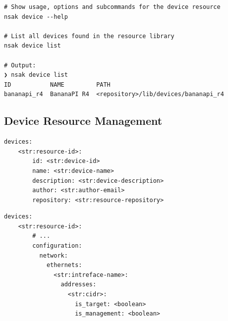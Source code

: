 \begin{listing}[H]
    \begin{verbatim}
# Show usage, options and subcommands for the device resource
nsak device --help

# List all devices found in the resource library
nsak device list

# Output:
❯ nsak device list
ID           NAME         PATH
bananapi_r4  BananaPI R4  <repository>/lib/devices/bananapi_r4
    \end{verbatim}
    \caption{NSAK CLI: List Devices}
    \label{lst:nsak-cli-list-devices}
\end{listing}

\subsection{Device Resource Management}\label{subsec:appendix-device-resource-management}

\begin{listing}[H]
    \begin{verbatim}
devices:
    <str:resource-id>:
        id: <str:device-id>
        name: <str:device-name>
        description: <str:device-description>
        author: <str:author-email>
        repository: <str:resource-repository>
    \end{verbatim}
    \caption{Device Resource YAML Specification}
    \label{lst:device-resource-yaml-specification}
\end{listing}

\begin{listing}[H]
    \begin{verbatim}
devices:
    <str:resource-id>:
        # ...
        configuration:
          network:
            ethernets:
              <str:intreface-name>:
                addresses:
                  <str:cidr>:
                    is_target: <boolean>
                    is_management: <boolean>
    \end{verbatim}
    \caption{Device Resource Configuration YAML Specification}
    \label{lst:device-resource-configuration-yaml-specification}
\end{listing}

\begin{listing}[H]
    \inputminted[firstline=20, lastline=87]{python}{../../../src/nsak/core/device/device_loader.py}
    \caption{DeviceLoader Configuration Parsing}
    \label{lst:device-loader-configuration-parsing}
\end{listing}

